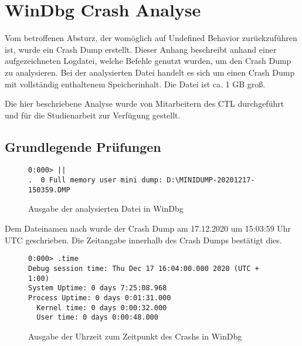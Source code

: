 \lstset{language=WinDbg}

\section{WinDbg Crash Analyse}
\label{sec:windbg}
Vom betroffenen Absturz, der womöglich auf Undefined Behavior zurückzuführen ist, wurde ein Crash Dump erstellt.
Dieser Anhang beschreibt anhand einer aufgezeichneten Logdatei, welche Befehle genutzt wurden, um den Crash Dump zu analysieren.
Bei der analysierten Datei handelt es sich um einen Crash Dump mit vollständig enthaltenem Speicherinhalt. Die Datei ist ca. 1 GB groß.

Die hier beschriebene Analyse wurde von Mitarbeitern des CTL durchgeführt und für die Studienarbeit zur Verfügung gestellt.

\subsection{Grundlegende Prüfungen}
\begin{figure}[H]
\begin{lstlisting}
0:000> ||
.  0 Full memory user mini dump: D:\MINIDUMP-20201217-150359.DMP
\end{lstlisting}
\caption{Ausgabe der analysierten Datei in WinDbg}
\end{figure}

Dem Dateinamen nach wurde der Crash Dump am 17.12.2020 um 15:03:59 Uhr UTC geschrieben. Die Zeitangabe innerhalb des Crash Dumps bestätigt dies.

\begin{figure}[H]
\begin{lstlisting}
0:000> .time
Debug session time: Thu Dec 17 16:04:00.000 2020 (UTC + 1:00)
System Uptime: 0 days 7:25:08.968
Process Uptime: 0 days 0:01:31.000
  Kernel time: 0 days 0:00:32.000
  User time: 0 days 0:00:48.000
\end{lstlisting}
\caption{Ausgabe der Uhrzeit zum Zeitpunkt des Crashs in WinDbg}
\end{figure}

